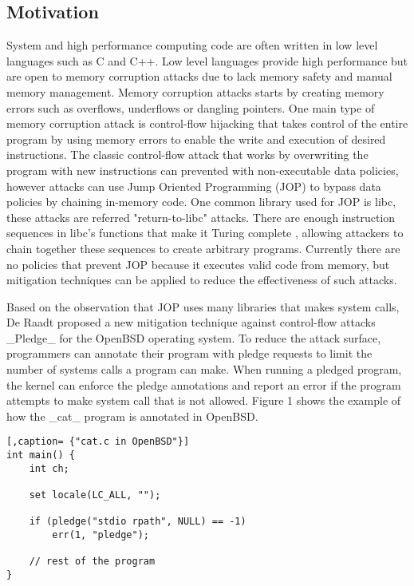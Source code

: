 \subsection{Motivation}

System and high performance computing code are often written in low level languages such as C and C++. Low level languages provide high performance but are open to memory corruption attacks due to lack memory safety and manual memory management. Memory corruption attacks \cite{Szekeres_2013} starts by creating memory errors such as overflows, underflows or dangling pointers. One main type of memory corruption attack is control-flow hijacking that takes control of the entire program by using memory errors to enable the write and execution of desired instructions. The classic control-flow attack that works by overwriting the program with new instructions can prevented with non-executable data policies, however attacks can use Jump Oriented Programming (JOP) to bypass data policies by chaining in-memory code. One common library used for JOP is libc, these attacks are referred "return-to-libc" attacks. There are enough instruction sequences in libc's functions that make it Turing complete \cite{Tran_2011}, allowing attackers to chain together these sequences to create arbitrary programs. Currently there are no policies that prevent JOP because it executes valid code from memory, but mitigation techniques \cite{Li_2010}\cite{Pappas_2012}\cite{pledge} can be applied to reduce the effectiveness of such attacks.

Based on the observation that JOP uses many libraries that makes system calls, De Raadt proposed a new mitigation technique against control-flow attacks _Pledge_\cite{pledge} for the OpenBSD operating system. To reduce the attack surface, programmers can annotate their program with pledge\cite{pledge(2)} requests to limit the number of systems calls a program can make. When running a pledged program, the kernel can enforce the pledge annotations and report an error if the program attempts to make system call that is not allowed. Figure 1 shows the example of how the _cat_ program is annotated in OpenBSD.

\begin{lstlisting}[,caption= {"cat.c in OpenBSD"}]
int main() {
    int ch;
    
    set locale(LC_ALL, "");
    
    if (pledge("stdio rpath", NULL) == -1)
        err(1, "pledge");
        
    // rest of the program
}
\end{lstlisting}